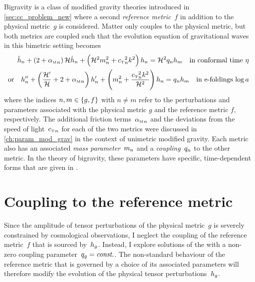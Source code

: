 \documentclass[12pt,parskip=half]{scrreprt}
\begin{document}
Bigravity is a class of modified gravity theories introduced in \autoref{sec:cc_problem_new} where a second \emph{reference metric}~\(f\) in addition to the physical metric~\(g\) is considered. Matter only couples to the physical metric, but both metrics are coupled such that the evolution equation of gravitational waves in this bimetric setting becomes \citep{Amendola2015}
\begin{subequations}\label{eq:evolution_bimetric}
\begin{align}
	\ddconf{h}\ofmetr{n} + \del{2 + \alphaMofmetr{n}} \Hconf \dconf{h}\ofmetr{n} + \del{\Hconf^2 \mofmetr{n}^2 + \cTofmetr{n}^2 k^2} h\ofmetr{n} = \Hconf^2 \qofmetr{n} h\ofmetr{m} \quad \text{in conformal time \(\conft\)} \\
    \text{or} \quad \ddefold{h}\ofmetr{n} + \del{\frac{\defold{\Hconf}}{\Hconf} + 2 + \alphaMofmetr{n}} \defold{h}\ofmetr{n} + \del{\mofmetr{n}^2 + \frac{\cTofmetr{n}^2 k^2}{\Hconf^2}} h\ofmetr{n} = \qofmetr{n} h\ofmetr{m} \quad \text{in e-foldings \(\efold\)}
\end{align}
\end{subequations}
where the indices \(n,m \in \cbr{g,f}\) with \(n \neq m\) refer to the perturbations and parameters associated with the physical metric \(g\) and the reference metric \(f\), respectively. The additional friction terms~\({\alpha_{\textnormal{\tiny{M}}}}_{n}\) and the deviations from the speed of light~\({c_{\textnormal{\tiny{T}}}}_{n}\) for each of the two metrics were discussed in \autoref{ch:param_mod_grav} in the context of unimetric modified gravity. Each metric also has an associated \emph{mass parameter}~\(m_{n}\) and a \emph{coupling}~\(q_{n}\) to the other metric. In the theory of bigravity, these parameters have specific, time-dependent forms that are given in \cite{Amendola2015}.

\section{Coupling to the reference metric}\label{sec:bimetric_coupling}

Since the amplitude of tensor perturbations of the physical metric~\(g\) is severely constrained by cosmological observations, I neglect the coupling of the reference metric~\(f\) that is sourced by~\(h_{g}\). Instead, I explore solutions of the  with a non-zero coupling parameter~\(q_{g}=\textnormal{\textit{const.}}\). The non-standard behaviour of the reference metric that is governed by a choice of its associated parameters will therefore modify the evolution of the physical tensor perturbations~\(h_{g}\). 
\end{document}

